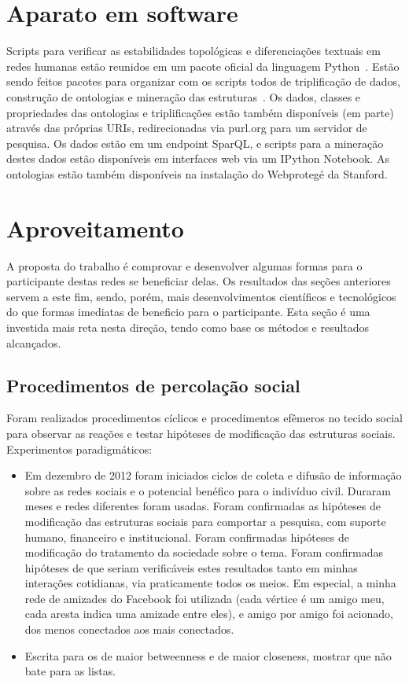 \documentclass[a4paper,openright,12pt]{report} %
\begin{document}
\section{Aparato em software}
Scripts para verificar as estabilidades topológicas e diferenciações textuais em redes humanas estão reunidos em um pacote oficial da linguagem Python~\cite{gmanePack}.
Estão sendo feitos pacotes para organizar com os scripts todos
de triplificação de dados, construção de ontologias e mineração das
estruturas~\cite{participation, percolation}. 
Os dados, classes e propriedades das
ontologias e triplificações estão também disponíveis (em parte)
através das próprias URIs, redirecionadas via purl.org
para um servidor de pesquisa.
Os dados estão em um endpoint SparQL, e scripts para a mineração
destes dados estão disponíveis em interfaces web via um
IPython Notebook. As ontologias estão também disponíveis
na instalação do Webprotegé da Stanford.

\section{Aproveitamento}
A proposta do trabalho é comprovar e desenvolver algumas formas para o participante destas redes se beneficiar delas.
Os resultados das seções anteriores servem a este fim, sendo, porém, mais desenvolvimentos científicos e tecnológicos do que formas imediatas
de beneficio para o participante.
Esta seção é uma investida mais reta nesta direção, tendo como base os métodos e resultados alcançados.

\subsection{Procedimentos de percolação social}\label{sec:exp}
Foram realizados procedimentos cíclicos e procedimentos efêmeros
no tecido social para observar as reações
e testar hipóteses de modificação das estruturas sociais.
Experimentos paradigmáticos:
\begin{itemize}
	\item Em dezembro de 2012 foram iniciados ciclos de
		coleta e difusão de informação sobre
		as redes sociais e o potencial benéfico para
		o indivíduo civil. Duraram meses e redes diferentes
		foram usadas. Foram confirmadas 
		as hipóteses de modificação das
		estruturas sociais para comportar a pesquisa,
		com suporte humano, financeiro e institucional.
		Foram confirmadas hipóteses de modificação
		do tratamento da sociedade sobre o tema.
		Foram confirmadas hipóteses de que seriam
		verificáveis estes resultados tanto em minhas
		interações cotidianas, via praticamente todos os meios.
		Em especial, a minha rede de amizades do Facebook
		foi utilizada (cada vértice é um amigo meu,
		cada aresta indica uma amizade entre eles), e
		amigo por amigo foi acionado,
		dos menos conectados aos mais conectados.
	\item Escrita para os de maior betweenness e de maior closeness, mostrar que não bate para as listas.
\end{itemize}
\end{document}
